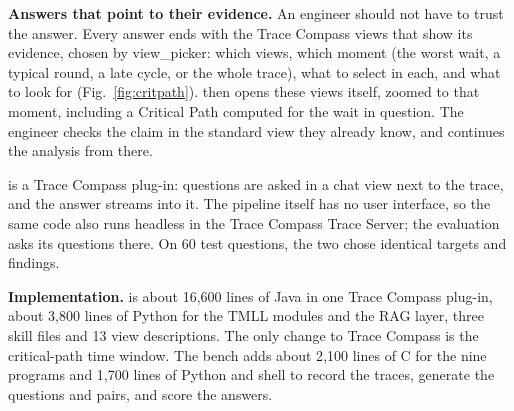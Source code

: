 \textbf{Answers that point to their evidence.} An engineer should not have to trust the answer. Every answer ends with the Trace Compass views that show its evidence, chosen by view\_picker: which views, which moment (the worst wait, a typical round, a late cycle, or the whole trace), what to select in each, and what to look for (Fig.~\ref{fig:critpath}). \sysname then opens these views itself, zoomed to that moment, including a Critical Path computed for the wait in question. The engineer checks the claim in the standard view they already know, and continues the analysis from there.

\sysname is a Trace Compass plug-in: questions are asked in a chat view next to the trace, and the answer streams into it. The pipeline itself has no user interface, so the same code also runs headless in the Trace Compass Trace Server; the evaluation asks its questions there. On 60 test questions, the two chose identical targets and findings.

\textbf{Implementation.} \sysname is about 16{,}600 lines of Java in one Trace Compass plug-in, about 3{,}800 lines of Python for the TMLL modules and the RAG layer, three skill files and 13 view descriptions. The only change to Trace Compass is the critical-path time window. The bench adds about 2{,}100 lines of C for the nine programs and 1{,}700 lines of Python and shell to record the traces, generate the questions and pairs, and score the answers.
